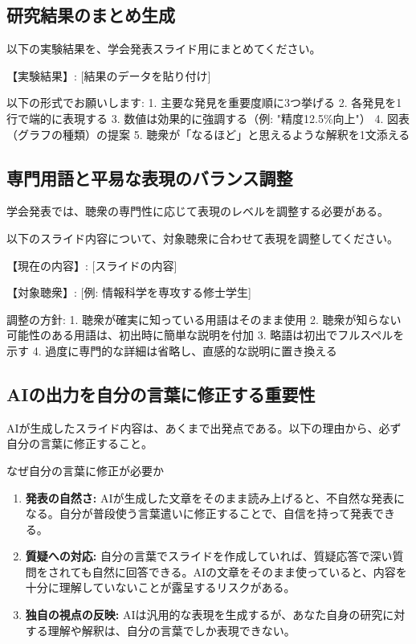 \subsection{研究結果のまとめ生成}

\begin{promptbox}
以下の実験結果を、学会発表スライド用にまとめてください。

【実験結果】:
{[}結果のデータを貼り付け]

以下の形式でお願いします:
1. 主要な発見を重要度順に3つ挙げる
2. 各発見を1行で端的に表現する
3. 数値は効果的に強調する（例: "精度12.5\%向上"）
4. 図表（グラフの種類）の提案
5. 聴衆が「なるほど」と思えるような解釈を1文添える
\end{promptbox}

\subsection{専門用語と平易な表現のバランス調整}

学会発表では、聴衆の専門性に応じて表現のレベルを調整する必要がある。

\begin{promptbox}
以下のスライド内容について、対象聴衆に合わせて表現を調整してください。

【現在の内容】:
{[}スライドの内容]

【対象聴衆】: [例: 情報科学を専攻する修士学生]

調整の方針:
1. 聴衆が確実に知っている用語はそのまま使用
2. 聴衆が知らない可能性のある用語は、初出時に簡単な説明を付加
3. 略語は初出でフルスペルを示す
4. 過度に専門的な詳細は省略し、直感的な説明に置き換える
\end{promptbox}

\subsection{AIの出力を自分の言葉に修正する重要性}

AIが生成したスライド内容は、あくまで出発点である。以下の理由から、必ず自分の言葉に修正すること。

\begin{itembox}[l]{なぜ自分の言葉に修正が必要か}
\begin{enumerate}
\item \textbf{発表の自然さ:} AIが生成した文章をそのまま読み上げると、不自然な発表になる。自分が普段使う言葉遣いに修正することで、自信を持って発表できる。
\item \textbf{質疑への対応:} 自分の言葉でスライドを作成していれば、質疑応答で深い質問をされても自然に回答できる。AIの文章をそのまま使っていると、内容を十分に理解していないことが露呈するリスクがある。
\item \textbf{独自の視点の反映:} AIは汎用的な表現を生成するが、あなた自身の研究に対する理解や解釈は、自分の言葉でしか表現できない。
\end{enumerate}
\end{itembox}

